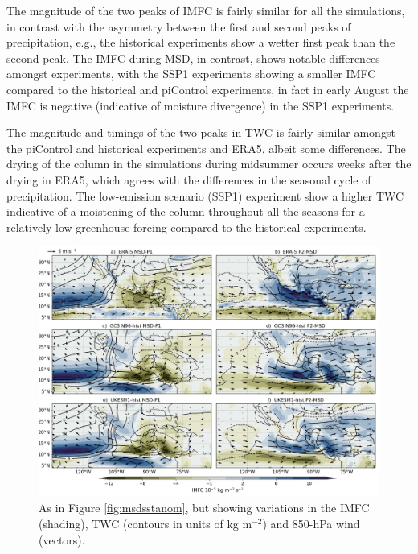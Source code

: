 The magnitude of the two peaks of IMFC is fairly similar for all the simulations, in contrast with the asymmetry between the first and second peaks of precipitation, e.g., the historical experiments show a wetter first peak than the second peak. The IMFC during MSD, in contrast, shows notable differences amongst experiments, with the SSP1 experiments showing a smaller IMFC compared to the historical and piControl experiments, in fact in early August the IMFC is negative (indicative of moisture divergence) in the SSP1 experiments.

 The magnitude and timings of the two peaks in  TWC is fairly similar amongst the piControl and historical experiments and ERA5, albeit some differences. The drying of the column in the simulations during midsummer occurs weeks after the drying in ERA5, which agrees with the differences in the seasonal cycle of precipitation. The low-emission scenario (SSP1) experiment show a higher TWC indicative of a moistening of the column throughout all the seasons for a relatively low greenhouse forcing compared to the historical experiments. %

\begin{figure}[t!]
\includegraphics[width=\linewidth]{figures/imfdcomposite.png}
\caption[Composites of IMFC, TWC and CLLJ]{As in Figure \ref{fig:msdsstanom}, but showing variations in the IMFC (shading), TWC (contours in units of kg m$^{-2}$) and 850-hPa wind (vectors). }
\label{fig:msdmfcanom}
\end{figure}

